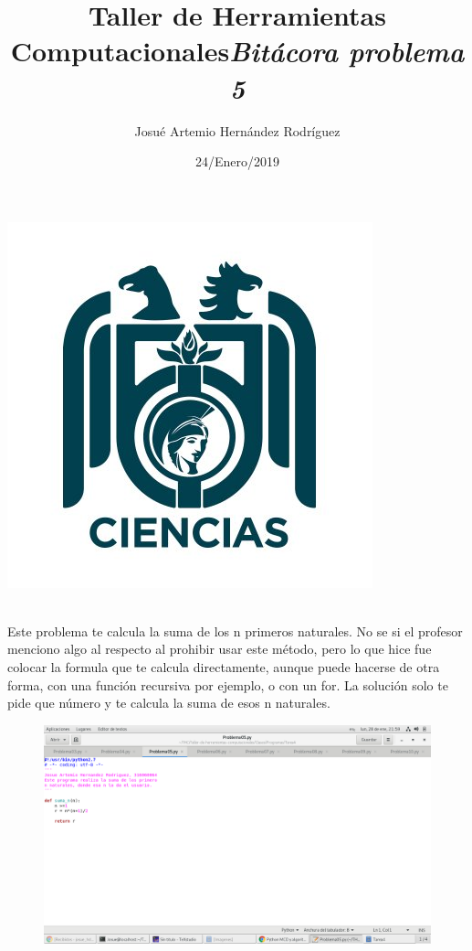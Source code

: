 \label{key}\documentclass[letterpaper, 12pt,oneside]{article}
\title{\Huge Taller de Herramientas Computacionales}
\author{Josué Artemio Hernández Rodríguez}
\date{24/Enero/2019}
\begin{document}
	\maketitle
	\begin{center}
		\includegraphics[scale=0.7]{3.jpg}
	\end{center}

	\newpage
	
	\title{\huge \textit{Bitácora problema 5 }}\\

	Este problema te calcula la suma de los n primeros naturales. No se si el profesor menciono algo al respecto al prohibir usar este método, pero lo que hice fue colocar la formula que te calcula directamente, aunque puede hacerse de otra forma, con una función recursiva por ejemplo, o con un for. La solución solo te pide que número y te calcula la suma de esos n naturales. 
	
	 

	\begin{figure}[h]
		\includegraphics[scale=0.3]{pro05.png}
	\end{figure}
	
	
	
	
	
	
	
	
	
	
	
\end{document}
